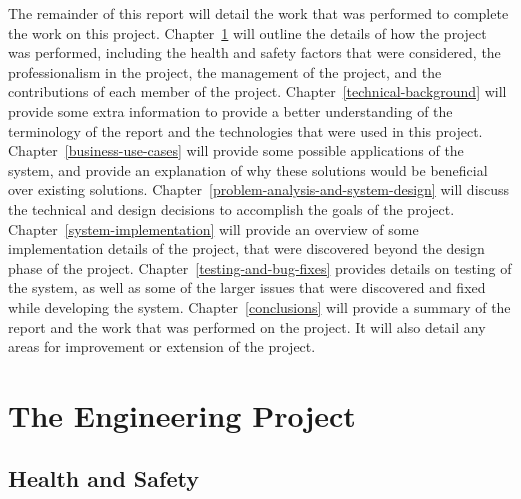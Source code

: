 \documentclass[12pt]{report}
\let\Oldsection\section
\renewcommand{\section}{\FloatBarrier\Oldsection}
\begin{document}
The remainder of this report will detail the work that was performed to complete the work on this project.
Chapter~\ref{the-engineering-project} will outline the details of how the project was performed, including
the health and safety factors that were considered, the professionalism in the project, the management of
the project, and the contributions of each member of the project.
Chapter~\ref{technical-background} will provide some extra information to provide a better understanding of
the terminology of the report and the technologies that were used in this project.
Chapter~\ref{business-use-cases} will provide some possible applications of the system, and provide an explanation
of why these solutions would be beneficial over existing solutions.
Chapter~\ref{problem-analysis-and-system-design} will discuss the technical and design decisions to accomplish the
goals of the project.
Chapter~\ref{system-implementation} will provide an overview of some implementation details of the project, that were
discovered beyond the design phase of the project.
Chapter~\ref{testing-and-bug-fixes} provides details on testing of the system, as well as some of the larger issues that
were discovered and fixed while developing the system.
Chapter~\ref{conclusions} will provide a summary of the report and the work that was performed on the project.
It will also detail any areas for improvement or extension of the project.


\chapter{The Engineering Project} \label{the-engineering-project}


\section{Health and Safety} \label{health-and-safety}
\end{document}
